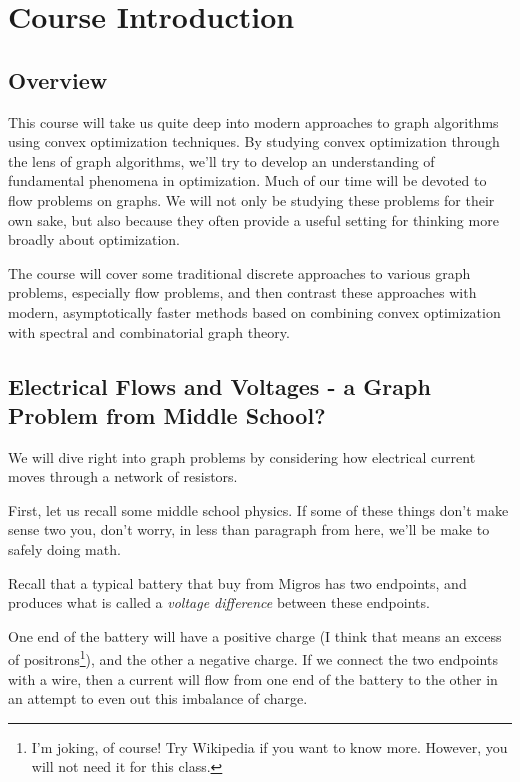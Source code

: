\chapter{Course Introduction}
\label{sec:intro}

\sloppy

\section{Overview}
 This course will take us quite deep into modern approaches to
 graph algorithms using convex optimization techniques.
%
 By studying convex optimization through the lens of graph algorithms,
 we'll try to develop an understanding of fundamental
 phenomena in optimization.
 Much of our time will be devoted to flow problems on graphs.
 We will not only be studying these problems for their own sake,
 but also because they often provide a useful setting for thinking more broadly about optimization.

 The course will cover some traditional discrete approaches to various graph
 problems, especially flow problems, and then contrast these approaches
 with modern, asymptotically faster methods based on combining convex
 optimization with spectral and combinatorial graph theory.

\section{Electrical Flows and Voltages - a Graph Problem from Middle School?}

We will dive right into graph problems by considering how electrical
current moves through a network of resistors.

First, let us recall some middle school physics.
If some of these things don't make sense two you, don't worry, in less
than paragraph from here, we'll be make to safely doing math.

Recall that a typical battery that buy from Migros has two
endpoints, and produces what is called a \emph{voltage
  difference} between these endpoints.

One end of the battery will have a positive charge (I think that means an excess of
positrons\footnote{I'm joking, of course! Try Wikipedia if you want to know
more. However, you will not need it for this class.}), and the other a
negative charge.
If we connect the two endpoints with a wire, then a current will flow
from one end of the battery to the other in an attempt to even out
this imbalance of charge.

